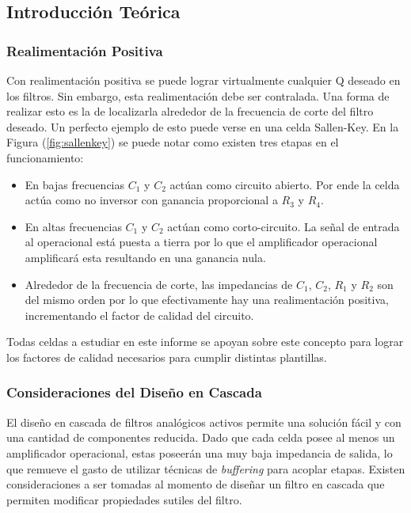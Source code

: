 


\subsection{Introducción Teórica}

\subsubsection{Realimentación Positiva}

Con realimentación positiva se puede lograr virtualmente cualquier Q deseado en los filtros. Sin embargo, esta realimentación debe ser contralada. Una forma de realizar esto es la de localizarla alrededor de la frecuencia de corte del filtro deseado. Un perfecto ejemplo de esto puede verse en una celda Sallen-Key. En la Figura (\ref{fig:sallenkey}) se puede notar como existen tres etapas en el funcionamiento:

\begin{itemize}
\item En bajas frecuencias $C_1$ y $C_2$ actúan como circuito abierto. Por ende la celda actúa como no inversor con ganancia proporcional a $R_3$ y $R_4$. 
\item En altas frecuencias $C_1$ y $C_2$ actúan como corto-circuito. La señal de entrada al operacional está puesta a tierra por lo que el amplificador operacional amplificará esta resultando en una ganancia nula. 
\item Alrededor de la frecuencia de corte, las impedancias de $C_1$, $C_2$, $R_1$ y $R_2$ son del mismo orden por lo que efectivamente hay una realimentación positiva, incrementando el factor de calidad del circuito.
\end{itemize}

Todas celdas a estudiar en este informe se apoyan sobre este concepto para lograr los factores de calidad necesarios para cumplir distintas plantillas.

\subsubsection{Consideraciones del Diseño en Cascada}
El diseño en cascada de filtros analógicos activos permite una solución fácil y con una cantidad de componentes reducida. Dado que cada celda posee al menos un amplificador operacional, estas poseerán una muy baja impedancia de salida, lo que remueve el gasto de utilizar técnicas de \textit{buffering} para acoplar etapas. Existen consideraciones a ser tomadas al momento de diseñar un filtro en cascada que permiten modificar propiedades sutiles del filtro. 

